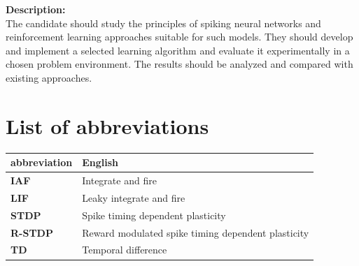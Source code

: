 \documentclass[a4paper,12pt,openright]{book}
\newcommand{\clearemptydoublepage}{\newpage{\pagestyle{empty}\cleardoublepage}}
\begin{document}
\bigskip
\noindent\textbf{Description:}\\
The candidate should study the principles of spiking neural networks and reinforcement learning approaches suitable for such models. They should develop and implement a selected learning algorithm and evaluate it experimentally in a chosen problem environment. The results should be analyzed and compared with existing approaches.

\vfill



\vspace{2cm}

\clearemptydoublepage

\pagestyle{empty}
\def\thepage{}%
\tableofcontents{}


\clearemptydoublepage


\chapter*{List of abbreviations}

\noindent\begin{tabular}{p{}|p{}}    %
  {\bf abbreviation} & {\bf English} \\ \hline
  {\bf IAF} & Integrate and fire \\
  {\bf LIF} & Leaky integrate and fire \\
  {\bf STDP} & Spike timing dependent plasticity \\
  {\bf R-STDP} & Reward modulated spike timing dependent plasticity \\
  {\bf TD}   & Temporal difference \\
\end{tabular}
\end{document}
